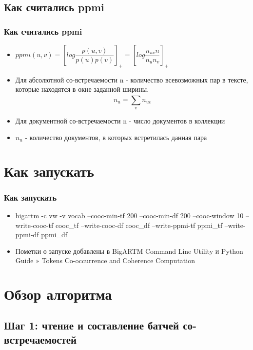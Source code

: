 \documentclass{beamer}
\begin{document}

\subsection{Как считались ppmi}

\begin{frame}
\frametitle{Как считались ppmi}
\begin{itemize}
\item
$ ppmi(u, v) = \left [log{\dfrac{p(u, v)}{p(u)p(v)}} \right]_{+} = 
\left [log \dfrac{n_{uv}n}{n_{u}n_{v}} \right]_{+} $
\item Для абсолютной со-встречаемости n - количество всевозможных пар в тексте, которые находятся в окне заданной ширины.
$$ n_{u} = \sum_{v}^{}n_{uv} $$
\item Для документной со-встречаемости n - число документов в коллекции
\item $ n_{u} $ - количество документов, в которых встретилась данная пара
\end{itemize}
\end{frame}

\section{Как запускать}

\begin{frame}
\frametitle{Как запускать}
\begin{itemize}
\item bigartm -c vw -v vocab --cooc-min-tf 200 --cooc-min-df 200 --cooc-window 10 --write-cooc-tf cooc\_tf --write-cooc-df cooc\_df --write-ppmi-tf ppmi\_tf --write-ppmi-df ppmi\_df
\item Пометки о запуске добавлены в BigARTM Command Line Utility и Python Guide » Tokens Co-occurrence and Coherence Computation
\end{itemize}
\end{frame}

\section{Обзор алгоритма}

\subsection{Шаг 1: чтение и составление батчей со-встречаемостей}
\end{document}
